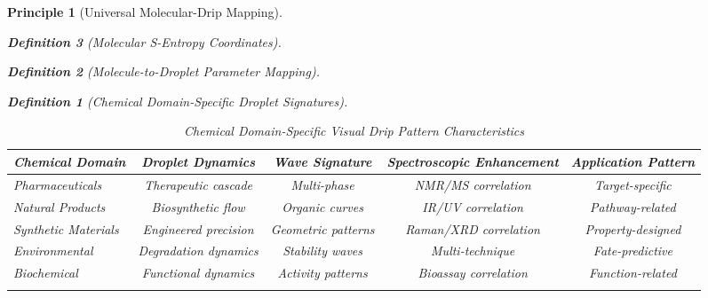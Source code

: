 \documentclass[12pt,a4paper]{article}
\newtheorem{definition}{Definition}
\newtheorem{principle}{Principle}
\begin{document}
\begin{principle}[Universal Molecular-Drip Mapping]
\begin{definition}[Molecular S-Entropy Coordinates]
\begin{definition}[Molecule-to-Droplet Parameter Mapping]
\begin{algorithm}
\begin{algorithmic}[1]
\begin{definition}[Chemical Domain-Specific Droplet Signatures]
\begin{table}[H]
\centering
\caption{Chemical Domain-Specific Visual Drip Pattern Characteristics}
\begin{tabular}{lcccc}
\toprule
Chemical Domain & Droplet Dynamics & Wave Signature & Spectroscopic Enhancement & Application Pattern \\
\midrule
Pharmaceuticals & Therapeutic cascade & Multi-phase & NMR/MS correlation & Target-specific \\
Natural Products & Biosynthetic flow & Organic curves & IR/UV correlation & Pathway-related \\
Synthetic Materials & Engineered precision & Geometric patterns & Raman/XRD correlation & Property-designed \\
Environmental & Degradation dynamics & Stability waves & Multi-technique & Fate-predictive \\
Biochemical & Functional dynamics & Activity patterns & Bioassay correlation & Function-related \\
\bottomrule
\end{tabular>
</table>

\section{Computer Vision Chemical Analysis Framework}

\subsection{Comprehensive Chemical Drip Pattern Recognition}

\begin{lstlisting}[style=pythonstyle, caption=Computer Vision Comprehensive Chemical Pattern Analysis]
class ChemicalDripPatternComputerVision:
    def __init__(self):
        self.chemical_pattern_recognizer = ChemicalConvolutionalNeuralNetwork()
        self.spectroscopic_wave_analyzer = SpectroscopicWavePatternAnalyzer()
        self.chemical_sequence_processor = ChemicalTemporalSequenceProcessor()
        self.compound_identification_engine = CompoundIdentificationClassifier()
        self.property_prediction_engine = ChemicalPropertyPredictor()
        self.drug_discovery_engine = DrugDiscoveryAnalyzer()
        
    def analyze_chemical_drip_video_for_comprehensive_analysis(self, chemical_drip_video):
        """Extract comprehensive chemical insights from drip pattern video"""
        

\end{lstlisting}
\end{tabular}
\end{table}
\end{definition}
\end{algorithmic}
\end{algorithm}
\end{definition}
\end{definition}
\end{principle}
\end{document}
